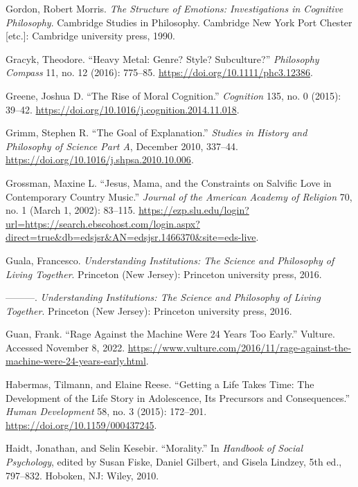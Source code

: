 \documentclass[phdthesis,12pt,final]{wuthesis}
\newlength{\cslhangindent}
\newenvironment{CSLReferences}[2] %
{\begin{list}{}{%
	\setlength{\itemindent}{0pt}
	\setlength{\leftmargin}{0pt}
	\setlength{\parsep}{0pt}
	\ifodd #1
	\setlength{\leftmargin}{\cslhangindent}
	\setlength{\itemindent}{-1\cslhangindent}
	\fi
	\setlength{\itemsep}{#2\baselineskip}}}
{\end{list}}
\theoremstyle{definition}
\theoremstyle{definition}
\theoremstyle{definition}
\theoremstyle{definition}
\theoremstyle{remark}
\begin{document}
\begin{CSLReferences}{1}{0}
Gordon, Robert Morris. \emph{The Structure of Emotions: Investigations in Cognitive Philosophy}. Cambridge Studies in Philosophy. Cambridge New York Port Chester {[}etc.{]}: Cambridge university press, 1990.

Gracyk, Theodore. {``Heavy Metal: Genre? {Style}? {Subculture}?''} \emph{Philosophy Compass} 11, no. 12 (2016): 775--85. \url{https://doi.org/10.1111/phc3.12386}.

Greene, Joshua D. {``The Rise of Moral Cognition.''} \emph{Cognition} 135, no. 0 (2015): 39--42. \url{https://doi.org/10.1016/j.cognition.2014.11.018}.

Grimm, Stephen R. {``The Goal of Explanation.''} \emph{Studies in History and Philosophy of Science Part A}, December 2010, 337--44. \url{https://doi.org/10.1016/j.shpsa.2010.10.006}.

Grossman, Maxine L. {``Jesus, {Mama}, and the {Constraints} on {Salvific Love} in {Contemporary Country Music}.''} \emph{Journal of the American Academy of Religion} 70, no. 1 (March 1, 2002): 83--115. \url{https://ezp.slu.edu/login?url=https://search.ebscohost.com/login.aspx?direct=true&db=edsjsr&AN=edsjsr.1466370&site=eds-live}.

Guala, Francesco. \emph{Understanding Institutions: The Science and Philosophy of Living Together}. Princeton (New Jersey): Princeton university press, 2016.

---------. \emph{Understanding {Institutions}: {The Science} and {Philosophy} of {Living Together}}. Princeton (New Jersey): Princeton university press, 2016.

Guan, Frank. {``Rage Against the Machine Were 24 Years Too Early.''} Vulture. Accessed November 8, 2022. \url{https://www.vulture.com/2016/11/rage-against-the-machine-were-24-years-early.html}.

Habermas, Tilmann, and Elaine Reese. {``Getting a Life Takes Time: The Development of the Life Story in Adolescence, Its Precursors and Consequences.''} \emph{Human Development} 58, no. 3 (2015): 172--201. \url{https://doi.org/10.1159/000437245}.

Haidt, Jonathan, and Selin Kesebir. {``Morality.''} In \emph{Handbook of Social Psychology}, edited by Susan Fiske, Daniel Gilbert, and Gisela Lindzey, 5th ed., 797--832. Hoboken, NJ: Wiley, 2010.


\end{CSLReferences}
\end{document}
